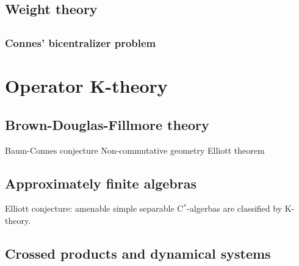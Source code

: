 \documentclass{../note}
\begin{document}
\begin{prb}

\end{prb}




\chapter{Weight theory}





\chapter{}
\section{Connes' bicentralizer problem}












\part{Operator K-theory}
\chapter{Brown-Douglas-Fillmore theory}
\begin{prb}
\end{prb}

Baum-Connes conjecture
Non-commutative geometry
Elliott theorem




\chapter{Approximately finite algebras}
Elliott conjecture: amenable simple separable C$^*$-algerbas are classified by K-theory.

\chapter{Crossed products and dynamical systems}
\end{document}
